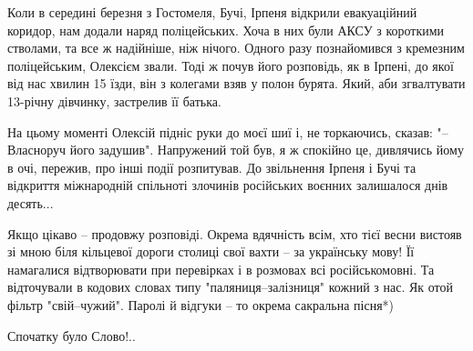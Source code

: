 Коли в середині березня з Гостомеля, Бучі, Ірпеня відкрили евакуаційний
коридор, нам додали наряд поліцейських. Хоча в них були АКСУ з короткими
стволами, та все ж надійніше, ніж нічого. Одного разу познайомився з кремезним
поліцейським, Олексієм звали. Тоді ж почув його розповідь, як в Ірпені, до якої
від нас хвилин 15 їзди, він з колегами взяв у полон бурята. Який, аби
згвалтувати 13-річну дівчинку, застрелив її батька.

На цьому моменті Олексій підніс руки до моєї шиї і, не торкаючись, сказав: "–
Власноруч його задушив". Напружений той був, я ж спокійно це, дивлячись йому в
очі, пережив, про інші події розпитував. До звільнення Ірпеня і Бучі та
відкриття міжнародній спільноті злочинів російських воєнних залишалося днів
десять...

Якщо цікаво – продовжу розповіді. Окрема вдячність всім, хто тієї весни вистояв
зі мною біля кільцевої дороги столиці свої вахти – за українську мову! Її
намагалися відтворювати при перевірках і в розмовах всі російськомовні. Та
відточували в кодових словах типу "паляниця–залізниця" кожний з нас. Як отой
фільтр "свій–чужий". Паролі й відгуки – то окрема сакральна пісня*)

Спочатку було Слово!..

